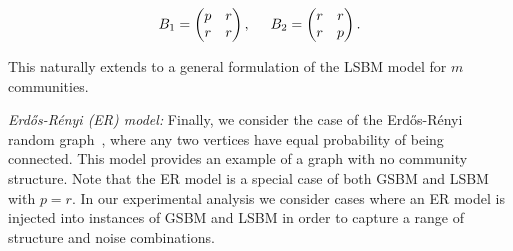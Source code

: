 \documentclass[twoside,twocolumn]{article}
\newcommand{\er}{Erd\H{o}s-R\'{e}nyi }
\begin{document}
\[
B_1=\begin{pmatrix}
p & r \\
r & r
\end{pmatrix},
\hspace{0.5cm}
B_2=\begin{pmatrix}
r & r \\
r & p
\end{pmatrix}
.\]

This naturally extends to a general formulation of the LSBM model for $m$
communities.

{\em \er (ER) model:} Finally, we consider the case of the \er random
graph~\cite{Erdos60}, where any two vertices have equal probability of being
connected. This model provides an example of a graph with no community
structure. Note that the ER model is a special case of both GSBM and LSBM with
$p=r$. In our experimental analysis we consider cases where an ER model is
injected into instances of GSBM and LSBM in order to capture a range of
structure and noise combinations.

\begin{table}
\caption{Description of datasets analyzed. Total number of vertices in each
source graph is n=500.  m is the number of graph sources. $n_i$ represents
number of vertices in cluster $i$. $p_i$ and $r_i$ represent the within- and
across-cluster edge probability for each the $m$ graph sources.}
\centering
{}
\label{datasets}
\end{table}
\end{document}
